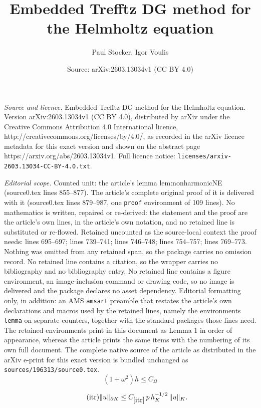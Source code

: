 \documentclass[10pt,a4paper]{amsart}
\title{Embedded Trefftz DG method for the Helmholtz equation}
\author{Paul Stocker, Igor Voulis}
\date{Source: arXiv:2603.13034v1 (CC BY 4.0)}
\newcommand{\const}[1]{C_{\eqref{#1}}}
\begin{document}
\maketitle

\noindent\emph{Source and licence.} Embedded Trefftz DG method for the Helmholtz equation. Version arXiv:2603.13034v1 (CC BY 4.0), distributed by arXiv under the Creative Commons Attribution 4.0 International licence, http://creativecommons.org/licenses/by/4.0/, as recorded in the arXiv licence metadata for this exact version and shown on the abstract page https://arxiv.org/abs/2603.13034v1. Full licence notice: \texttt{licenses/arxiv-2603.13034-CC-BY-4.0.txt}.\par\smallskip

\noindent\textit{Editorial scope.} Counted unit: the article's lemma lem:nonharmonicNE (source0.tex lines 855--877). The article's complete original proof of it is delivered with it (source0.tex lines 879--987, one \texttt{proof} environment of 109 lines). No mathematics is written, repaired or re-derived: the statement and the proof are the article's own lines, in the article's own notation, and no retained line is substituted or re-flowed.  Retained uncounted as the source-local context the proof needs: lines 695--697; lines 739--741; lines 746--748; lines 754--757; lines 769--773.  Nothing was omitted from any retained span, so the package carries no omission record.  No retained line contains a citation, so the wrapper carries no bibliography and no bibliography entry.  No retained line contains a figure environment, an image-inclusion command or drawing code, so no image is delivered and the package declares no asset dependency.  Editorial formatting only, in addition: an AMS \texttt{amsart} preamble that restates the article's own declarations and macros used by the retained lines, namely the environments \texttt{lemma} on separate counters, together with the standard packages those lines need.  The retained environments print in this document as Lemma 1 in order of appearance, whereas the article prints the same items with the numbering of its own full document.  The complete native source of the article as distributed in the arXiv e-print for this exact version is bundled unchanged as \texttt{sources/196313/source0.tex}.
\begin{equation}\label{ass:oh}
    (1+\omega^2)h \leq C_\Omega
\end{equation}

\begin{equation}\tag{itr}\label{itr}
\|u\|_{\partial K} \leq \const{itr}\,p\,h_K^{-1/2}\,\|u\|_{K}.
\end{equation}
\end{document}
